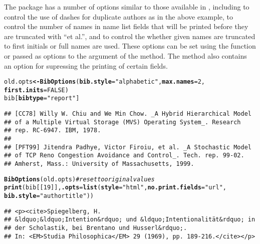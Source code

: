 \documentclass[article]{jss}\usepackage[]{graphicx}\usepackage[]{color}
\makeatletter
\newcommand{\hlnum}[1]{\textcolor[rgb]{0.125,0.125,1}{#1}}%
\newcommand{\hlstr}[1]{\textcolor[rgb]{0.125,0.125,1}{#1}}%
\newcommand{\hlcom}[1]{\textcolor[rgb]{1,0,0.753}{\textit{#1}}}%
\newcommand{\hlstd}[1]{\textcolor[rgb]{0.251,0.251,0.282}{#1}}%
\newcommand{\hlkwb}[1]{\textcolor[rgb]{0.439,0.251,1}{\textbf{#1}}}%
\newcommand{\hlkwc}[1]{\textcolor[rgb]{0.529,0,0.184}{\textbf{#1}}}%
\newcommand{\hlkwd}[1]{\textcolor[rgb]{0.251,0.251,0.282}{\textbf{#1}}}%
\newenvironment{kframe}{%
 \def\at@end@of@kframe{}%
 \ifinner\ifhmode%
  \def\at@end@of@kframe{\end{minipage}}%
  \begin{minipage}{\columnwidth}%
 \fi\fi%
 \def\FrameCommand##1{\hskip\@totalleftmargin \hskip-\fboxsep
 \colorbox{shadecolor}{##1}\hskip-\fboxsep
     \hskip-\linewidth \hskip-\@totalleftmargin \hskip\columnwidth}%
 \MakeFramed {\advance\hsize-\width
   \@totalleftmargin\z@ \linewidth\hsize
   \@setminipage}}%
 {\par\unskip\endMakeFramed%
 \at@end@of@kframe}
\newenvironment{knitrout}{}{} %
\makeatother
\begin{document}
The package has a number of options similar to those available in \Biblatex{}, including  to control the use of dashes for duplicate authors as in the above example,  to control the number of names in name list fields that will be printed before they are truncated with ``et al.'', and  to control the whether given names are truncated to first initials or full names are used.  These options can be set using the  function or passed as options to the  argument of the  method. The  method also contains an option for supressing the printing of certain fields.
\begin{knitrout}
\color{fgcolor}\begin{kframe}
\begin{alltt}
\hlstd{old.opts} \hlkwb{<-} \hlkwd{BibOptions}\hlstd{(}\hlkwc{bib.style} \hlstd{=} \hlstr{"alphabetic"}\hlstd{,} \hlkwc{max.names} \hlstd{=} \hlnum{2}\hlstd{,}
                       \hlkwc{first.inits} \hlstd{=} \hlnum{FALSE}\hlstd{)}
\hlstd{bib[}\hlkwc{bibtype} \hlstd{=} \hlstr{"report"}\hlstd{]}
\end{alltt}
\begin{verbatim}
## [CC78] Willy W. Chiu and We Min Chow. _A Hybrid Hierarchical Model
## of a Multiple Virtual Storage (MVS) Operating System_. Research
## rep. RC-6947. IBM, 1978.
## 
## [PFT99] Jitendra Padhye, Victor Firoiu, et al. _A Stochastic Model
## of TCP Reno Congestion Avoidance and Control_. Tech. rep. 99-02.
## Amherst, Mass.: University of Massachusetts, 1999.
\end{verbatim}
\begin{alltt}
\hlkwd{BibOptions}\hlstd{(old.opts)}  \hlcom{# reset to original values}
\hlkwd{print}\hlstd{(bib[[}\hlnum{19}\hlstd{]],} \hlkwc{.opts} \hlstd{=} \hlkwd{list}\hlstd{(}\hlkwc{style} \hlstd{=} \hlstr{"html"}\hlstd{,} \hlkwc{no.print.fields} \hlstd{=} \hlstr{"url"}\hlstd{,}
      \hlkwc{bib.style} \hlstd{=} \hlstr{"authortitle"}\hlstd{))}
\end{alltt}
\begin{verbatim}
## <p><cite>Spiegelberg, H.
## &ldquo;&ldquo;Intention&rdquo; und &ldquo;Intentionalität&rdquo; in
## der Scholastik, bei Brentano und Husserl&rdquo;.
## In: <EM>Studia Philosophica</EM> 29 (1969), pp. 189-216.</cite></p>
\end{verbatim}
\end{kframe}
\end{knitrout}
\end{document}

